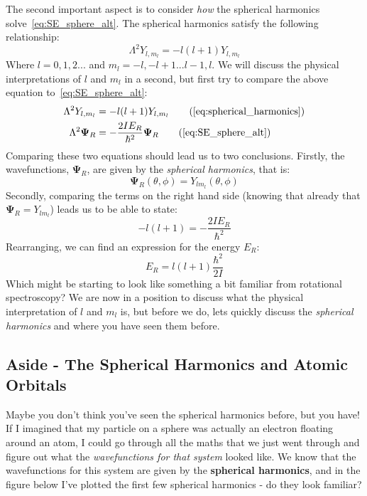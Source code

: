 \documentclass{memoir}[11pt,oneside,a4paper,openany]
\newcommand{\wf}{\ensuremath{\bm{\Psi}}\xspace}
\begin{document}
The second important aspect is to consider \emph{how} the spherical harmonics solve~\autoref{eq:SE_sphere_alt}. The spherical harmonics satisfy the following relationship:
\begin{equation}\label{eq:spherical_harmonics}
	\Lambda^2Y_{l,m_l} = -l(l+1)Y_{l,m_l}
\end{equation}
Where $l = 0,1,2...$ and $m_l = -l, -l+1...l-1,l$. We will discuss the physical interpretations of $l$ and $m_l$ in a second, but first try to compare the above equation to~\autoref{eq:SE_sphere_alt}:
\begin{align*}
	\Lambda^2Y_{l,m_l} &= -l(l+1)Y_{l,m_l} \tag{\ref{eq:spherical_harmonics}}\\
	\Lambda^2\wf_{R} &= -\frac{2IE_R}{\hbar^2}\wf_R \tag{\ref{eq:SE_sphere_alt}}
\end{align*}
Comparing these two equations should lead us to two conclusions. Firstly, the wavefunctions, $\wf_R$, are given by the \emph{spherical harmonics}, that is:
\begin{equation}
	\wf_R(\theta,\phi) = Y_{lm_l}(\theta,\phi)
\end{equation}
Secondly, comparing the terms on the right hand side (knowing that already that $\wf_R = Y_{lm_l}$) leads us to be able to state:
\begin{equation}
	-l(l+1) = -\frac{2IE_R}{\hbar^2}
\end{equation}
Rearranging, we can find an expression for the energy $E_R$:
\begin{equation}
	E_R = l(l+1)\frac{\hbar^2}{2I}
\end{equation}
Which might be starting to look like something a bit familiar from rotational spectroscopy? We are now in a position to discuss what the physical interpretation of $l$ and $m_l$ is, but before we do, lets quickly discuss the \emph{spherical harmonics} and where you have seen them before. 

\subsection{Aside - The Spherical Harmonics and Atomic Orbitals}
Maybe you don't think you've seen the spherical harmonics before, but you have! If I imagined that my particle on a sphere was actually an electron floating around an atom, I could go through all the maths that we just went through and figure out what the \emph{wavefunctions for that system} looked like. We know that the wavefunctions for this system are given by the \textbf{spherical harmonics}, and in the figure below I've plotted the first few spherical harmonics - do they look familiar?
\end{document}
